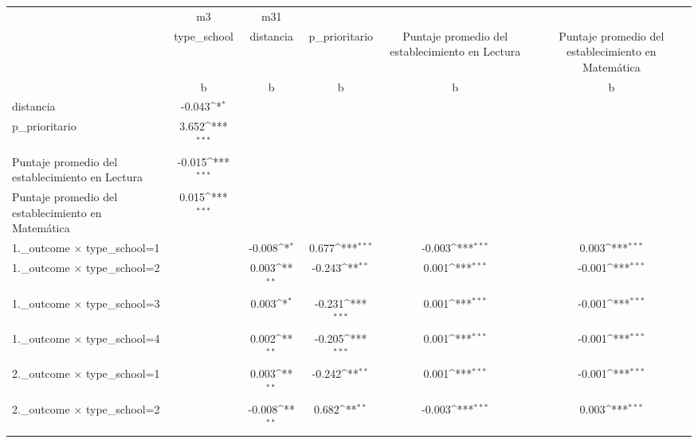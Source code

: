 {
\def\sym#1{\ifmmode^{#1}\else\(^{#1}\)\fi}
\begin{tabular}{l*{5}{c}}
\toprule
                    &          m3         &         m31         &                     &                     &                     \\
                    & type\_school         &   distancia         &p\_prioritario         &Puntaje promedio del establecimiento en Lectura         &Puntaje promedio del establecimiento en Matemática         \\
                    &           b         &           b         &           b         &           b         &           b         \\
\midrule
distancia           &      -0.043\sym{*}  &                     &                     &                     &                     \\
p\_prioritario       &       3.652\sym{***}&                     &                     &                     &                     \\
Puntaje promedio del establecimiento en Lectura&      -0.015\sym{***}&                     &                     &                     &                     \\
Puntaje promedio del establecimiento en Matemática&       0.015\sym{***}&                     &                     &                     &                     \\
1.\_outcome $\times$ type\_school=1&                     &      -0.008\sym{*}  &       0.677\sym{***}&      -0.003\sym{***}&       0.003\sym{***}\\
1.\_outcome $\times$ type\_school=2&                     &       0.003\sym{**} &      -0.243\sym{**} &       0.001\sym{***}&      -0.001\sym{***}\\
1.\_outcome $\times$ type\_school=3&                     &       0.003\sym{*}  &      -0.231\sym{***}&       0.001\sym{***}&      -0.001\sym{***}\\
1.\_outcome $\times$ type\_school=4&                     &       0.002\sym{**} &      -0.205\sym{***}&       0.001\sym{***}&      -0.001\sym{***}\\
2.\_outcome $\times$ type\_school=1&                     &       0.003\sym{**} &      -0.242\sym{**} &       0.001\sym{***}&      -0.001\sym{***}\\
2.\_outcome $\times$ type\_school=2&                     &      -0.008\sym{**} &       0.682\sym{**} &      -0.003\sym{***}&       0.003\sym{***}\\

\end{tabular}}
